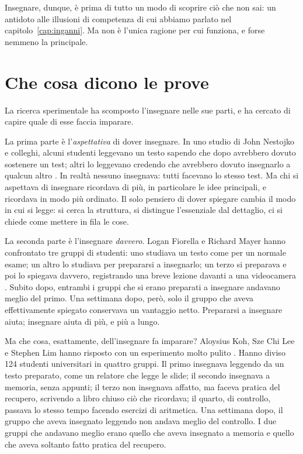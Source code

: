 Insegnare, dunque, è prima di tutto un modo di scoprire ciò che non
sai: un antidoto alle illusioni di competenza di cui abbiamo parlato nel
capitolo~\ref{cap:inganni}. Ma non è l'unica ragione per cui funziona,
e forse nemmeno la principale.

\section{Che cosa dicono le prove}

La ricerca sperimentale ha scomposto l'insegnare nelle sue parti, e ha
cercato di capire quale di esse faccia imparare.

La prima parte è l'\emph{aspettativa} di dover insegnare. In uno studio
di John Nestojko e colleghi, alcuni studenti leggevano un testo sapendo
che dopo avrebbero dovuto sostenere un test; altri lo leggevano
credendo che avrebbero dovuto insegnarlo a qualcun altro
\parencite{nestojko2014}. In realtà nessuno insegnava: tutti facevano lo
stesso test. Ma chi si aspettava di insegnare ricordava di più, in
particolare le idee principali, e ricordava in modo più ordinato. Il
solo pensiero di dover spiegare cambia il modo in cui si legge: si
cerca la struttura, si distingue l'essenziale dal dettaglio, ci si
chiede come mettere in fila le cose.

La seconda parte è l'insegnare \emph{davvero}. Logan Fiorella e Richard
Mayer hanno confrontato tre gruppi di studenti: uno studiava un testo
come per un normale esame; un altro lo studiava per prepararsi a
insegnarlo; un terzo si preparava e poi lo spiegava davvero, registrando
una breve lezione davanti a una videocamera \parencite{fiorella2013}.
Subito dopo, entrambi i gruppi che si erano preparati a insegnare
andavano meglio del primo. Una settimana dopo, però, solo il gruppo che
aveva effettivamente spiegato conservava un vantaggio netto. Prepararsi
a insegnare aiuta; insegnare aiuta di più, e più a lungo.

Ma che cosa, esattamente, dell'insegnare fa imparare? Aloysius Koh,
Sze Chi Lee e Stephen Lim hanno risposto con un esperimento molto
pulito \parencite{koh2018}. Hanno diviso 124 studenti universitari in
quattro gruppi. Il primo insegnava leggendo da un testo preparato, come
un relatore che legge le slide; il secondo insegnava a memoria, senza
appunti; il terzo non insegnava affatto, ma faceva pratica del recupero,
scrivendo a libro chiuso ciò che ricordava; il quarto, di controllo,
passava lo stesso tempo facendo esercizi di aritmetica. Una settimana
dopo, il gruppo che aveva insegnato leggendo non andava meglio del
controllo. I due gruppi che andavano meglio erano quello che aveva
insegnato a memoria e quello che aveva soltanto fatto pratica del
recupero.

